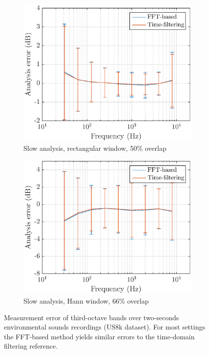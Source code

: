 \documentclass[sensors,article,submit,moreauthors,pdftex,10pt,a4paper]{mdpi}
\providecommand{\DIFaddtex}[1]{{\protect\color{blue}\uwave{#1}}} %
\providecommand{\DIFaddFL}[1]{\DIFadd{#1}} %
\providecommand{\DIFaddbeginFL}{} %
\providecommand{\DIFaddendFL}{} %
\providecommand{\DIFadd}[1]{\texorpdfstring{\DIFaddtex{#1}}{#1}} %
\begin{document}
\begin{figure}[h!]
	\begin{subfigure}[h]{0.45\textwidth}
        \centering
        \includegraphics[width=1\textwidth]{figures/err_m_u_s_r.eps}
        \caption{Slow analysis, rectangular window, 50\% overlap}
    \end{subfigure}
    \hfill
    \begin{subfigure}[h]{0.45\textwidth}
        \centering
        \includegraphics[width=1\textwidth]{figures/err_m_u_s_h.eps}
        \caption{Slow analysis, Hann window, 66\% overlap}
    \end{subfigure}
    \caption{Measurement error of third-octave bands over two-seconds environmental sounds recordings (US8k dataset). For most settings the FFT-based method yields similar errors \DIFaddbeginFL \DIFaddFL{compared }\DIFaddendFL to the time-domain filtering reference. \label{fig:errormu}}
\end{figure}
\end{document}
